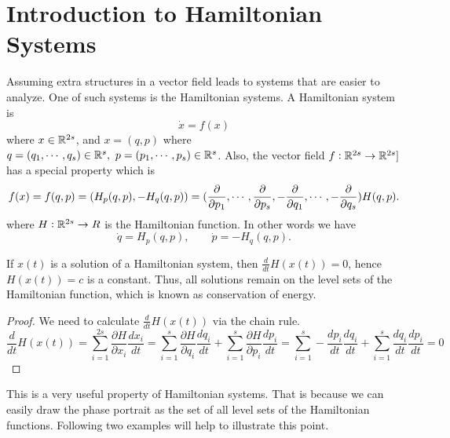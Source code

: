 \section{Introduction to Hamiltonian Systems}

Assuming extra structures in a vector field leads to systems that are easier to analyze. One of such systems is the Hamiltonian systems. A Hamiltonian system is
\[ \dot{x} = f(x) \]
where $x \in \mathbb{R}^{2s}$, and $x = (q,p)$ where $q=(q_1,\cdots,q_s)\in\R^s,\ p=(p_1,\cdots,p_s)\in\R^s$. Also, the vector field $f: \mathbb{R}^{2s}\to \mathbb{R}^{2s}]$ has a special property which is
\[ f(x)=f(q,p)=(H_p(q,p),-H_q(q,p)) = (\frac{\partial}{\partial p_1},\cdots,\frac{\partial}{\partial p_s},-\frac{\partial}{\partial q_1},\cdots,-\frac{\partial}{\partial q_s})H(q,p). \]
where $H: \mathbb{R}^{2s}\to R$ is the Hamiltonian function. In other words we have
\[ \dot{q} = H_p (q,p),\qquad \dot{p}=- H_q(q,p). \]



\begin{corbox}
	If $x(t)$ is a solution of a Hamiltonian system, then $\frac{d}{dt} H(x(t)) = 0$, hence $H(x(t))=c$ is a constant. Thus, all solutions remain on the level sets of the Hamiltonian function, which is known as conservation of energy.
\end{corbox}
\begin{proof}
	We need to calculate $\frac{d}{dt}H(x(t))$ via the chain rule.
	\[ \frac{d}{dt}H(x(t)) = \sum_{i=1}^{2s} \frac{\partial H}{\partial x_i} \frac{d x_i}{dt} = \sum_{i=1}^{s} \frac{\partial H}{\partial q_i} \frac{d q_i}{dt} + \sum_{i=1}^{s} \frac{\partial H}{\partial p_i} \frac{d p_i}{dt} = \sum_{i=1}^{s} -\frac{d p_i}{d t} \frac{d q_i}{dt} + \sum_{i=1}^{s} \frac{d q_i}{d t} \frac{d p_i}{dt} = 0\]
\end{proof}


This is a very useful property of Hamiltonian systems. That is because we can easily draw the phase portrait as the set of all level sets of the Hamiltonian functions. Following two examples will help to illustrate this point. 

